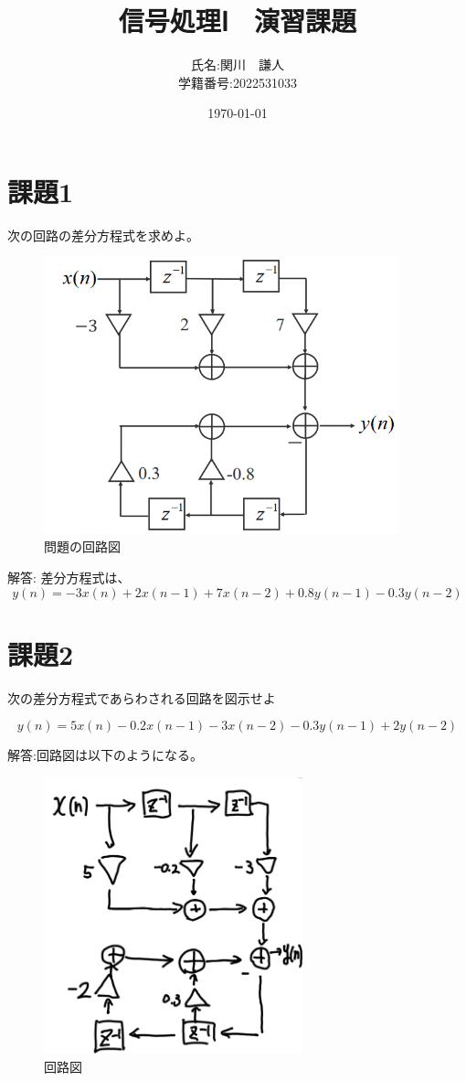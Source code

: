 \documentclass[a4paper,11pt]{ltjsarticle}
\begin{document}
\title{信号処理Ⅰ　演習課題}
\author{氏名:関川　謙人\\学籍番号:2022531033}
\date{\today}
\maketitle

\section*{課題1}
次の回路の差分方程式を求めよ。

\begin{figure}[h]
\begin{center}
\includegraphics*[height = 8cm]{kadai12/circ1.png}
\caption{問題の回路図}
\end{center}
\end{figure}

解答:
差分方程式は、
\begin{equation*}
  y(n) = -3x(n) + 2x(n-1) + 7x(n-2) + 0.8y(n-1) - 0.3y(n-2)
\end{equation*}

\section*{課題2}
次の差分方程式であらわされる回路を図示せよ

\begin{equation*}
  y(n) = 5x(n) - 0.2x(n-1) - 3x(n-2) - 0.3y(n-1) + 2y(n-2)
\end{equation*}

解答:回路図は以下のようになる。
\begin{figure}[h]
\begin{center}
\includegraphics*[height = 8cm]{kadai12/circ2.png}
\caption{回路図}
\end{center}
\end{figure}
\end{document}
